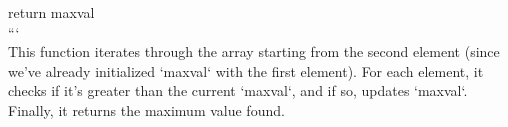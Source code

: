 \documentclass[preview]{standalone}
\begin{document}
return maxval\\```\\This function iterates through the array starting from the second element (since we've already initialized `maxval` with the first element). For each element, it checks if it's greater than the current `maxval`, and if so, updates `maxval`. Finally, it returns the maximum value found.\\
\end{document}
